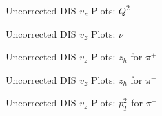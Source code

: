 \begin{frame}{Uncorrected DIS $v_z$ Plots: $Q^2$}
    \label{20.15a::q2}

    \begin{figure}[t]
    \end{figure}

\end{frame}

\begin{frame}{Uncorrected DIS $v_z$ Plots: $\nu$}
    \label{20.15b::nu}

    \begin{figure}[t]
    \end{figure}

\end{frame}

\begin{frame}{Uncorrected DIS $v_z$ Plots: $z_h$ for $\pi^+$}
    \label{20.15c::zh_pi+}

    \begin{figure}[t]
    \end{figure}

\end{frame}

\begin{frame}{Uncorrected DIS $v_z$ Plots: $z_h$ for $\pi^-$}
    \label{20.15d::zh_pi-}

    \begin{figure}[t]
    \end{figure}

\end{frame}

\begin{frame}{Uncorrected DIS $v_z$ Plots: $p_T^2$ for $\pi^+$}
    \label{20.15e::pt2_pi+}

    \begin{figure}[t]
    \end{figure}

\end{frame}

